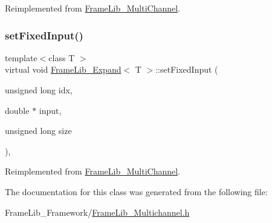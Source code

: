 Reimplemented from \hyperlink{class_frame_lib___multi_channel_af27f3dca507c48459452be825b4c0c72}{Frame\+Lib\+\_\+\+Multi\+Channel}.

\mbox{\label{class_frame_lib___expand_a73f7bf4264d45f56f249d6303b3e4c35}} 
\subsubsection{\texorpdfstring{set\+Fixed\+Input()}{setFixedInput()}}
{\footnotesize\ttfamily template$<$class T $>$ \\
virtual void \hyperlink{class_frame_lib___expand}{Frame\+Lib\+\_\+\+Expand}$<$ T $>$\+::set\+Fixed\+Input (\begin{DoxyParamCaption}\item[{unsigned long}]{idx,  }\item[{double $\ast$}]{input,  }\item[{unsigned long}]{size }\end{DoxyParamCaption})\hspace{0.3cm}{\ttfamily [inline]}, {\ttfamily [virtual]}}



Reimplemented from \hyperlink{class_frame_lib___multi_channel_a2bbd1050ff53556bf671282312857301}{Frame\+Lib\+\_\+\+Multi\+Channel}.



The documentation for this class was generated from the following file\+:\begin{DoxyCompactItemize}
\item 
Frame\+Lib\+\_\+\+Framework/\hyperlink{_frame_lib___multichannel_8h}{Frame\+Lib\+\_\+\+Multichannel.\+h}\end{DoxyCompactItemize}
